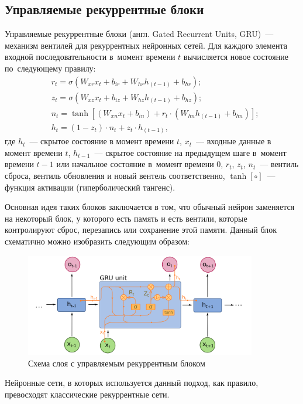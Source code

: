 \subsection{Управляемые рекуррентные блоки}\label{GRU}

Управляемые рекуррентные блоки (англ. Gated Recurrent Units, GRU)~--- механизм вентилей для рекуррентных нейронных сетей.
Для каждого элемента входной последовательности в~момент времени $ t $ 
вычисляется новое состояние по~следующему правилу:
\begin{align*}
	&r_t = \sigma(W_{xr} x_t + b_{ir} + W_{hr} h_{(t-1)} + b_{hr}); \\
	&z_t = \sigma(W_{xz} x_t + b_{iz} + W_{hz} h_{(t-1)} + b_{hz}); \\
	&n_t = \tanh\left[ (W_{xn} x_t + b_{in}) + r_t \cdot (W_{hn} h_{(t-1)}+ b_{hn})\right]\!{;} \\
	&h_t = (1 - z_t) \cdot n_t + z_t \cdot h_{(t-1)},
\end{align*}
где $ h_t $~--- скрытое состояние в момент времени $ t $, $ x_t $~--- входные данные в момент 
времени $ t $, $ h_{t-1} $~--- скрытое состояние на предыдущем шаге в~момент времени $ t {-} 1$ или 
начальное состояние в~момент времени 0, $ r_t $, $ z_t $, $ n_t $~--- вентиль сброса, вентиль обновления и 
новый вентель соответственно, $ \tanh \left[ \circ \right] $~--- функция активации (гиперболический тангенс).  

\clearpage
Основная идея таких блоков заключается в том, что обычный нейрон заменяется 
на некоторый блок, у которого есть память и есть вентили, которые контролируют сброс, перезапись или сохранение этой памяти.
Данный блок схематично можно изобразить следующим образом:
\begin{figure}[!h]
	\centering
	\includegraphics[width=0.9\textwidth]{pics/gru_layer}
	\caption{Схема слоя с управляемым рекуррентным блоком}
	\label{gru_layer}
\end{figure}

Нейронные сети, в которых используется данный подход, как правило, превосходят \cite{rnn_compare}
классические рекуррентные сети.
